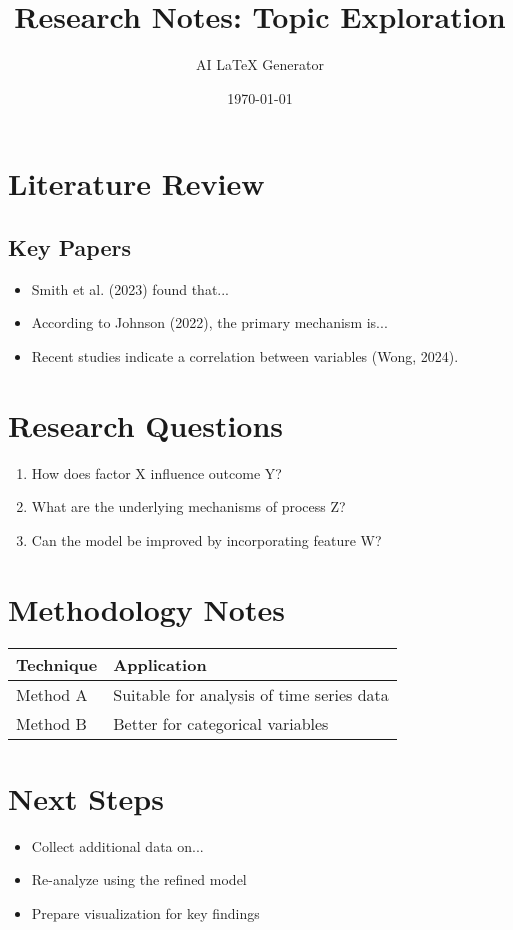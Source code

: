 \documentclass{article}
\title{Research Notes: Topic Exploration}
\author{AI LaTeX Generator}
\date{\today}
\begin{document}
\maketitle

\section{Literature Review}
\subsection{Key Papers}
\begin{itemize}
    \item Smith et al. (2023) found that...
    \item According to Johnson (2022), the primary mechanism is...
    \item Recent studies indicate a correlation between variables (Wong, 2024).
\end{itemize}

\section{Research Questions}
\begin{enumerate}
    \item How does factor X influence outcome Y?
    \item What are the underlying mechanisms of process Z?
    \item Can the model be improved by incorporating feature W?
\end{enumerate}

\section{Methodology Notes}
\begin{tabular}{|p{3cm}|p{8cm}|}
\hline
\textbf{Technique} & \textbf{Application} \\
\hline
Method A & Suitable for analysis of time series data \\
\hline
Method B & Better for categorical variables \\
\hline
\end{tabular}

\section{Next Steps}
\begin{itemize}
    \item Collect additional data on...
    \item Re-analyze using the refined model
    \item Prepare visualization for key findings
\end{itemize}
\end{document}
